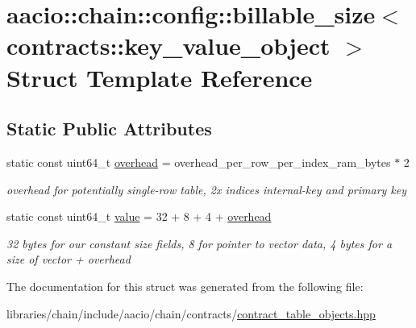 \hypertarget{structaacio_1_1chain_1_1config_1_1billable__size_3_01contracts_1_1key__value__object_01_4}{}\section{aacio\+:\+:chain\+:\+:config\+:\+:billable\+\_\+size$<$ contracts\+:\+:key\+\_\+value\+\_\+object $>$ Struct Template Reference}
\label{structaacio_1_1chain_1_1config_1_1billable__size_3_01contracts_1_1key__value__object_01_4}
\subsection*{Static Public Attributes}
\begin{DoxyCompactItemize}
\item 
\mbox{\label{structaacio_1_1chain_1_1config_1_1billable__size_3_01contracts_1_1key__value__object_01_4_ae15f3df3e764959252eb88c5cc0d48fe}} 
static const uint64\+\_\+t \mbox{\hyperlink{structaacio_1_1chain_1_1config_1_1billable__size_3_01contracts_1_1key__value__object_01_4_ae15f3df3e764959252eb88c5cc0d48fe}{overhead}} = overhead\+\_\+per\+\_\+row\+\_\+per\+\_\+index\+\_\+ram\+\_\+bytes $\ast$ 2
\begin{DoxyCompactList}\small\item\em overhead for potentially single-\/row table, 2x indices internal-\/key and primary key \end{DoxyCompactList}\item 
\mbox{\label{structaacio_1_1chain_1_1config_1_1billable__size_3_01contracts_1_1key__value__object_01_4_aafb6ffb90af23c2f975f2407a5dd59e5}} 
static const uint64\+\_\+t \mbox{\hyperlink{structaacio_1_1chain_1_1config_1_1billable__size_3_01contracts_1_1key__value__object_01_4_aafb6ffb90af23c2f975f2407a5dd59e5}{value}} = 32 + 8 + 4 + \mbox{\hyperlink{structaacio_1_1chain_1_1config_1_1billable__size_3_01contracts_1_1key__value__object_01_4_ae15f3df3e764959252eb88c5cc0d48fe}{overhead}}
\begin{DoxyCompactList}\small\item\em 32 bytes for our constant size fields, 8 for pointer to vector data, 4 bytes for a size of vector + overhead \end{DoxyCompactList}\end{DoxyCompactItemize}


The documentation for this struct was generated from the following file\+:\begin{DoxyCompactItemize}
\item 
libraries/chain/include/aacio/chain/contracts/\mbox{\hyperlink{contract__table__objects_8hpp}{contract\+\_\+table\+\_\+objects.\+hpp}}\end{DoxyCompactItemize}
